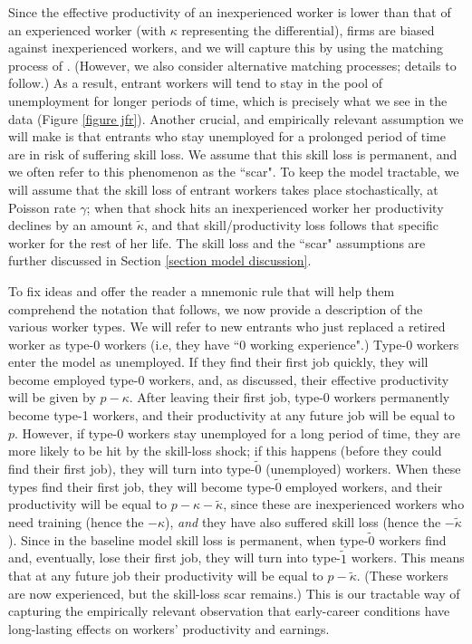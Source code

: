 \documentclass[12pt]{article} %
\theoremstyle{definition}
\begin{document}
Since the effective productivity of an inexperienced worker is lower than that of an experienced worker (with $\kappa$ representing the differential), firms are biased against inexperienced workers, and we will capture this by using the matching process of \cite{petrongolo2001looking}. (However, we also consider alternative matching processes; details to follow.) As a result, entrant workers will tend to stay in the pool of unemployment for longer periods of time, which is precisely what we see in the data (Figure \ref{figure jfr}). Another crucial, and empirically relevant assumption we will make is that entrants who stay unemployed for a prolonged period of time are in risk of suffering skill loss. We assume that this skill loss is permanent, and we often refer to this phenomenon as the ``scar".
To keep the model tractable, we will assume that the skill loss of entrant workers takes place stochastically, at Poisson rate $\gamma$; when that shock hits an inexperienced worker her productivity declines by an amount $\tilde{\kappa}$, and that skill/productivity loss follows that specific worker for the rest of her life. The skill loss and the ``scar" assumptions are further discussed in Section \ref{section model discussion}.   

To fix ideas and offer the reader a mnemonic rule that will help them comprehend the notation that follows, we now provide a description of the various worker types. We will refer to new entrants who just replaced a retired worker as type-0 workers (i.e, they have ``0 working experience".) 
Type-0 workers enter the model as unemployed. If they find their first job quickly, they will become employed type-0 workers, and, as discussed, their effective productivity will be given by $p-\kappa$. After leaving their first job, type-0 workers permanently become type-1 workers, and their productivity at any future job will be equal to $p$. However, if type-0 workers stay unemployed for a long period of time, they are more likely to be hit by the skill-loss shock; if this happens (before they could find their first job), they will turn into type-$\tilde{0}$ (unemployed) workers. When these types find their first job, they will become type-$\tilde{0}$ employed workers, and their productivity will be equal to $p-\kappa-\tilde{\kappa}$, since these are inexperienced workers who need training (hence the $-{\kappa}$), \textit{and} they have also suffered skill loss (hence the $-\tilde{\kappa}$). Since in the baseline model skill loss is permanent, when type-$\tilde{0}$ workers find and, eventually, lose their first job, they will turn into type-$\tilde{1}$ workers. This means that at any future job their productivity will be equal to $p-\tilde{\kappa}$. (These workers are now experienced, but the skill-loss scar remains.) This is our tractable way of capturing the empirically relevant observation that early-career conditions have long-lasting effects on workers' productivity and earnings.  
   
\end{document}
